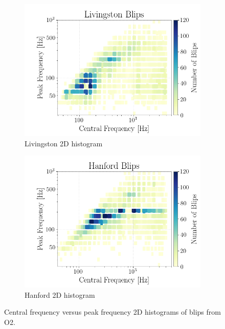 \documentclass[a4paper]{article}
\begin{document}
\begin{figure}[h!]
	\centering
	\begin{subfigure}{.49\textwidth}
		\centering
		\includegraphics[width=1\linewidth]{llo_peak_v_centr}
		\caption{Livingston 2D histogram}
		\label{fig:llo_centr}
	\end{subfigure}
	\begin{subfigure}{.49\textwidth}
		\centering
		\includegraphics[width=1\linewidth]{lho_peak_v_centr}
		\caption{Hanford 2D histogram}
		\label{fig:lho_centr}
	\end{subfigure}
	\caption{Central frequency versus peak frequency 2D histograms of blips from O2.}
	\label{fig:central_hists}
\end{figure}
\end{document}
